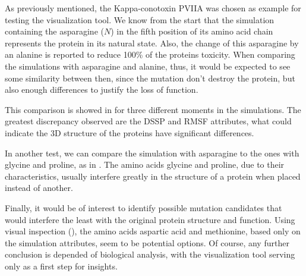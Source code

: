 \documentclass[10pt, conference]{IEEEtran}
\begin{document}
As previously mentioned, the Kappa-conotoxin PVIIA was chosen as example for testing the visualization tool. We know from the start that the simulation containing the asparagine ($N$) in the fifth position of its amino acid chain represents the protein in its natural state. Also, the change of this asparagine by an alanine is reported to reduce 100\% of the proteins toxicity. When comparing the simulations with asparagine and alanine, thus, it would be expected to see some similarity between then, since the mutation don't destroy the protein, but also enough differences to justify the loss of function. 

This comparison is showed in  for three different moments in the simulations. The greatest discrepancy observed are the DSSP and RMSF attributes, what could indicate the 3D structure of the proteins have significant differences.


In another test, we can compare the simulation with asparagine to the ones with glycine and proline, as in . The amino acids glycine and proline, due to their characteristics, usually interfere greatly in the structure of a protein when placed instead of another.


Finally, it would be of interest to identify possible mutation candidates that would interfere the least with the original protein structure and function. Using visual inspection (), the amino acids aspartic acid and methionine, based only on the simulation attributes, seem to be potential options. Of course, any further conclusion is depended of biological analysis, with the visualization tool serving only as a first step for insights. 

\end{document}
